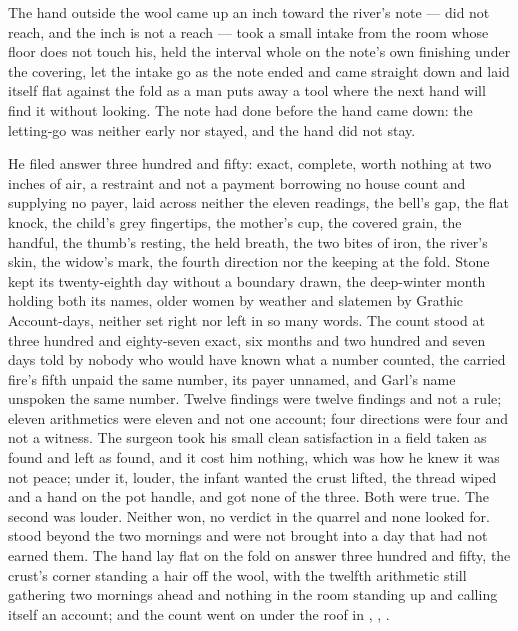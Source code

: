 The hand outside the wool came up an inch toward the river's note --- did not reach, and the inch is not a reach --- took a small intake from the room whose floor does not touch his, held the interval whole on the note's own finishing under the covering, let the intake go as the note ended and came straight down and laid itself flat against the fold as a man puts away a tool where the next hand will find it without looking. The note had done before the hand came down: the letting-go was neither early nor stayed, and the hand did not stay.

He filed answer three hundred and fifty: exact, complete, worth nothing at two inches of air, a restraint and not a payment borrowing no house count and supplying no payer, laid across neither the eleven readings, the bell's gap, the flat knock, the child's grey fingertips, the mother's cup, the covered grain, the handful, the thumb's resting, the held breath, the two bites of iron, the river's skin, the widow's mark, the fourth direction nor the keeping at the fold. Stone kept its twenty-eighth day without a boundary drawn, the deep-winter month holding both its names, older women by weather and slatemen by Grathic Account-days, neither set right nor left in so many words. The count stood at three hundred and eighty-seven exact, six months and two hundred and seven days told by nobody who would have known what a number counted, the carried fire's fifth unpaid the same number, its payer unnamed, and Garl's name unspoken the same number. Twelve findings were twelve findings and not a rule; eleven arithmetics were eleven and not one account; four directions were four and not a witness. The surgeon took his small clean satisfaction in a field taken as found and left as found, and it cost him nothing, which was how he knew it was not peace; under it, louder, the infant wanted the crust lifted, the thread wiped and a hand on the pot handle, and got none of the three. Both were true. The second was louder. Neither won, no verdict in the quarrel and none looked for.  stood beyond the two mornings and were not brought into a day that had not earned them. The hand lay flat on the fold on answer three hundred and fifty, the crust's corner standing a hair off the wool, with the twelfth arithmetic still gathering two mornings ahead and nothing in the room standing up and calling itself an account; and the count went on under the roof in , , .
